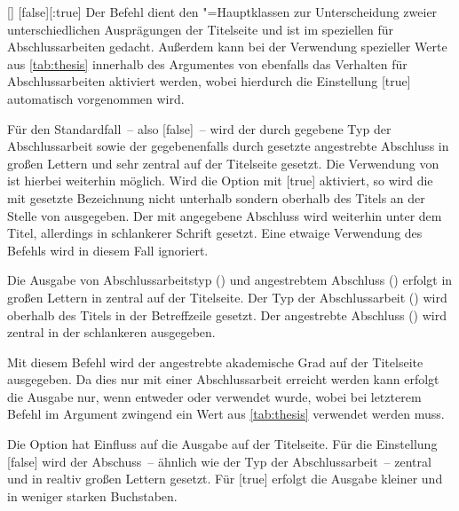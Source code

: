 \documentclass[%
  english,ngerman,%
  headings=optiontoheadandtoc,captions=tableheading,numbers=noenddot,%
  chapterpage,cdfoot,%
]{tudscrman}
\begin{document}
\begin{Declaration}{[\PBoolean]}%
  [false][:true]
\printdeclarationlist%
%
Der Befehl  dient den \TUDScript"=Hauptklassen zur Unterscheidung 
zweier unterschiedlichen Ausprägungen der Titelseite und ist im speziellen für 
Abschlussarbeiten gedacht. Außerdem kann bei der Verwendung spezieller Werte 
aus \autoref{tab:thesis} innerhalb des Argumentes von  ebenfalls 
das Verhalten für Abschlussarbeiten aktiviert werden, wobei hierdurch die 
Einstellung [true] automatisch vorgenommen wird.

Für den Standardfall~-- also [false]~-- wird der durch 
 gegebene Typ der Abschlussarbeit sowie der gegebenenfalls durch 
 gesetzte angestrebte Abschluss in großen Lettern und sehr 
zentral auf der Titelseite gesetzt. Die Verwendung von  ist 
hierbei weiterhin möglich.
%
Wird die Option mit [true] aktiviert, so wird die mit 
 gesetzte Bezeichnung nicht unterhalb sondern oberhalb des Titels 
an der Stelle von  ausgegeben. Der mit  angegebene 
Abschluss wird weiterhin unter dem Titel, allerdings in schlankerer Schrift 
gesetzt. Eine etwaige Verwendung des Befehls  wird in diesem Fall 
ignoriert.
%
\begin{values}
\itemfalse
  Die Ausgabe von Abschlussarbeitstyp () und angestrebtem 
  Abschluss () erfolgt in großen Lettern in \DIN zentral auf der 
  Titelseite.
\itemtrue*
  Der Typ der Abschlussarbeit () wird oberhalb des Titels in der 
  Betreffzeile gesetzt. Der angestrebte Abschluss () wird zentral 
  in der schlankeren \Univers ausgegeben.
\end{values}
\end{Declaration}

\begin{Declaration}{}
\printdeclarationlist%
%
%
Mit diesem Befehl wird der angestrebte akademische Grad auf der Titelseite 
ausgegeben. Da dies nur mit einer Abschlussarbeit erreicht werden kann erfolgt 
die Ausgabe nur, wenn entweder  oder  verwendet 
wurde, wobei bei letzterem Befehl im Argument zwingend ein Wert aus 
\autoref{tab:thesis} verwendet werden muss.

Die Option  hat Einfluss auf die Ausgabe auf der 
Titelseite. Für die Einstellung [false] wird der 
Abschuss~-- ähnlich wie 
der Typ der Abschlussarbeit~-- zentral und in realtiv großen Lettern gesetzt. 
Für [true] erfolgt die Ausgabe kleiner und in weniger 
starken Buchstaben.
\end{Declaration}
\end{document}
